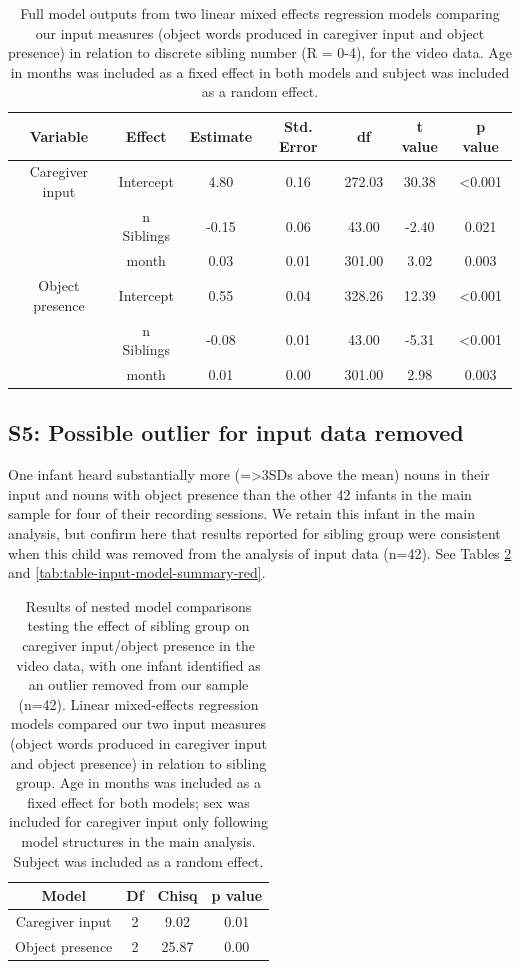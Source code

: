 \documentclass[
  man,mask,floatsintext]{apa6}
\begin{document}
\begin{longtable}[t]{ccccccc}
\caption{\label{tab:table-input-model-summary-discrete}Full model outputs from two linear mixed effects regression models comparing our input measures (object words produced in caregiver input and object presence) in relation to discrete sibling number (R = 0-4), for the video data. Age in months was included as a fixed effect in both models and subject was included as a random effect.}\\
\toprule
Variable & Effect & Estimate & Std. Error & df & t value & p value\\
\midrule
Caregiver input & Intercept & 4.80 & 0.16 & 272.03 & 30.38 & <0.001\\
 & n Siblings & -0.15 & 0.06 & 43.00 & -2.40 & 0.021\\
 & month & 0.03 & 0.01 & 301.00 & 3.02 & 0.003\\
Object presence & Intercept & 0.55 & 0.04 & 328.26 & 12.39 & <0.001\\
\midrule
 & n Siblings & -0.08 & 0.01 & 43.00 & -5.31 & <0.001\\
\addlinespace
 & month & 0.01 & 0.00 & 301.00 & 2.98 & 0.003\\
\bottomrule
\end{longtable}

\newpage

\hypertarget{s5-possible-outlier-for-input-data-removed}{%
\subsection{S5: Possible outlier for input data removed}\label{s5-possible-outlier-for-input-data-removed}}

One infant heard substantially more (=\textgreater3SDs above the mean) nouns in their input and nouns with object presence than the other 42 infants in the main sample for four of their recording sessions. We retain this infant in the main analysis, but confirm here that results reported for sibling group were consistent when this child was removed from the analysis of input data (n=42). See Tables \ref{tab:table-model-comparisons-red} and \ref{tab:table-input-model-summary-red}.

\begin{longtable}[t]{cccc}
\caption{\label{tab:table-model-comparisons-red}Results of nested model comparisons testing the effect of sibling group on caregiver input/object presence in the video data, with one infant identified as an outlier removed from our sample (n=42). Linear mixed-effects regression models compared our two input measures (object words produced in caregiver input  and object presence) in relation to sibling group. Age in months was included as a fixed effect for both models; sex was included for caregiver input only following model structures in the main analysis. Subject was included as a random effect.}\\
\toprule
Model & Df & Chisq & p value\\
\midrule
Caregiver input & 2 & 9.02 & 0.01\\
Object presence & 2 & 25.87 & 0.00\\
\bottomrule
\end{longtable}
\end{document}

